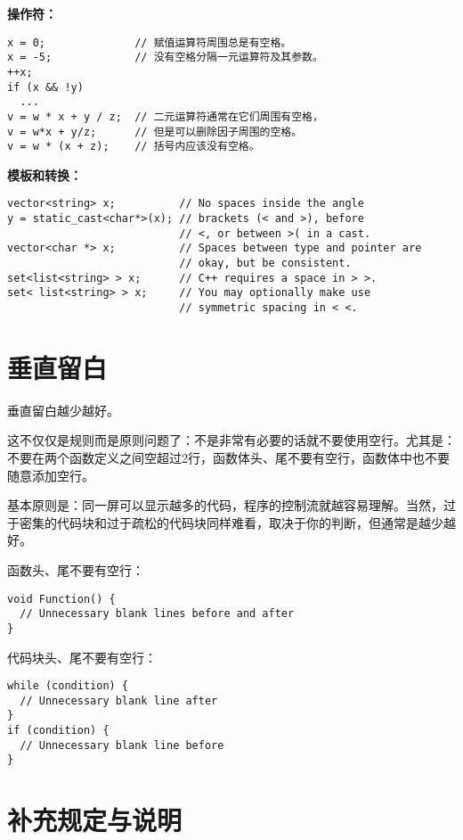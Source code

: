 \textbf{操作符：}
\begin{verbatim}
x = 0;              // 赋值运算符周围总是有空格。
x = -5;             // 没有空格分隔一元运算符及其参数。
++x;
if (x && !y)
  ...
v = w * x + y / z;  // 二元运算符通常在它们周围有空格，
v = w*x + y/z;      // 但是可以删除因子周围的空格。
v = w * (x + z);    // 括号内应该没有空格。
\end{verbatim}

\textbf{模板和转换：}
\begin{verbatim}
vector<string> x;          // No spaces inside the angle
y = static_cast<char*>(x); // brackets (< and >), before
                           // <, or between >( in a cast.
vector<char *> x;          // Spaces between type and pointer are
                           // okay, but be consistent.
set<list<string> > x;      // C++ requires a space in > >.
set< list<string> > x;     // You may optionally make use
                           // symmetric spacing in < <.
\end{verbatim}


\section{垂直留白}
垂直留白越少越好。

这不仅仅是规则而是原则问题了：不是非常有必要的话就不要使用空行。尤其是：不要在两个函数定义之间空超过2行，函数体头、尾不要有空行，函数体中也不要随意添加空行。

基本原则是：同一屏可以显示越多的代码，程序的控制流就越容易理解。当然，过于密集的代码块和过于疏松的代码块同样难看，取决于你的判断，但通常是越少越好。

函数头、尾不要有空行：
\begin{verbatim}
void Function() {
  // Unnecessary blank lines before and after
}
\end{verbatim}

代码块头、尾不要有空行：
\begin{verbatim}
while (condition) {
  // Unnecessary blank line after
}
if (condition) {
  // Unnecessary blank line before
}
\end{verbatim}


\section{补充规定与说明}


